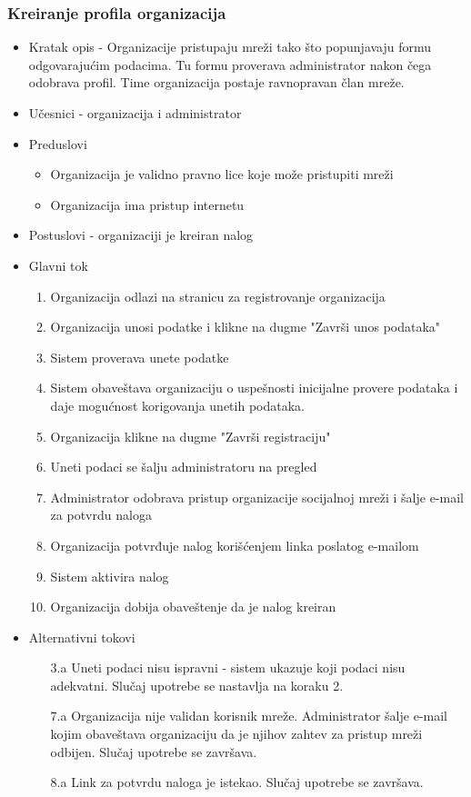 \subsubsection{Kreiranje profila organizacija}
\begin{itemize}
\item Kratak opis - Organizacije pristupaju mreži tako što popunjavaju formu odgovarajućim podacima. Tu formu proverava administrator nakon čega odobrava profil. Time organizacija postaje ravnopravan član mreže.
\item Učesnici - organizacija i administrator
\item Preduslovi
	\begin{itemize}
	\item Organizacija je validno pravno lice koje može pristupiti mreži 
	\item Organizacija ima pristup internetu
	\end{itemize}
\item Postuslovi - organizaciji je kreiran nalog
\item Glavni tok
	\begin{enumerate}
	\item Organizacija odlazi na stranicu za registrovanje organizacija
	\item Organizacija unosi podatke i klikne na dugme "Završi unos podataka"
	\item Sistem proverava unete podatke
	\item Sistem obaveštava organizaciju o uspešnosti inicijalne provere podataka i daje mogućnost korigovanja unetih podataka.
	\item Organizacija klikne na dugme "Završi registraciju"
	\item Uneti podaci se šalju administratoru na pregled
	\item Administrator odobrava pristup organizacije socijalnoj mreži i šalje e-mail za potvrdu naloga
	\item Organizacija potvrđuje nalog korišćenjem linka poslatog e-mailom
	\item Sistem aktivira nalog
	\item Organizacija dobija obaveštenje da je nalog kreiran
	\end{enumerate}
\item Alternativni tokovi
	\begin{itemize}
	\item[3.a] Uneti podaci nisu ispravni - sistem ukazuje koji podaci nisu adekvatni. Slučaj upotrebe se nastavlja na koraku 2.
	\item[7.a] Organizacija nije validan korisnik mreže. Administrator šalje e-mail kojim obaveštava organizaciju da je njihov zahtev za pristup mreži odbijen. Slučaj upotrebe se završava.
	\item[8.a] Link za potvrdu naloga je istekao. Slučaj upotrebe se završava.
	\end{itemize}
\end{itemize}

